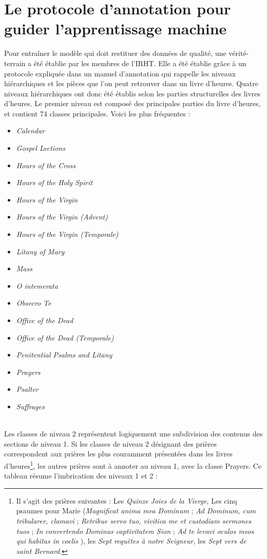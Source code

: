 \documentclass[a4paper,12pt,twoside]{book}
\begin{document}
	\section{\label{protocole_annotation}Le protocole d’annotation pour guider l’apprentissage machine}
	
	Pour entraîner le modèle qui doit restituer des données de qualité, une vérité-terrain a été établie par les membres de l'IRHT. Elle a été établie grâce à un protocole expliquée dans un manuel d'annotation qui rappelle les niveaux hiérarchiques et les pièces que l'on peut retrouver dans un livre d'heures. Quatre niveaux hiérarchiques ont donc été établis selon les parties structurelles des livres d'heures. Le premier niveau est composé des principales parties du livre d'heures, et contient 74 classes principales. Voici les plus fréquentes :
	\begin{itemize}
	    \item \textit{Calendar}
        \item \textit{Gospel Lections}
        \item \textit{Hours of the Cross}
        \item \textit{Hours of the Holy Spirit}
        \item \textit{Hours of the Virgin}
        \item \textit{Hours of the Virgin (Advent)}
        \item \textit{Hours of the Virgin (Temporale)}
        \item \textit{Litany of Mary}
        \item \textit{Mass}
        \item \textit{O intemerata}
        \item \textit{Obsecro Te}
        \item \textit{Office of the Dead}
        \item \textit{Office of the Dead (Temporale)}
        \item \textit{Penitential Psalms and Litany}
        \item \textit{Prayers}
        \item \textit{Psalter}
        \item \textit{Suffrages}
	\end{itemize} 
	\\
	
	Les classes de niveau 2 représentent logiquement une subdivision des contenus des sections de niveau 1. Si les classes de niveau 2 désignant des prières correspondent aux prières les plus couramment présentées dans les livres d’heures\footnote{Il s'agit des prières suivantes : Les \textit{Quinze Joies de la Vierge}, Les cinq psaumes pour Marie (\og \textit{Magnificat anima mea Dominum }\fg{} ; \of \textit{Ad Dominum, cum tribularer, clamavi}\fg{} ; \og \textit{Retribue servo tuo, vivitica me et custodiam sermones tuos }\fg{} ; \og \textit{In convertendo Dominus captivitatem Sion }\fg{} ; \og \textit{Ad te levavi oculos meos qui habitas in coelis }\fg{}), les \textit{Sept requêtes à notre Seigneur}, les \textit{Sept vers de saint Bernard}.}, les autres prières sont à annoter au niveau 1, avec la classe \og Prayers\fg{}. Ce tableau résume l'imbrication des niveaux 1 et 2 : 
\end{document}
